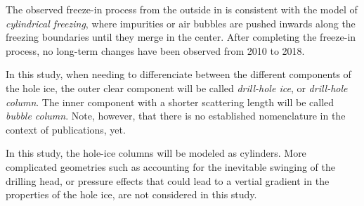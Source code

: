 The observed freeze-in process from the outside in is consistent with the model of \textit{cylindrical freezing}, where impurities or air bubbles are pushed inwards along the freezing boundaries until they merge in the center. \cite{rongenswedishcamera} After completing the freeze-in process, no long-term changes have been observed from 2010 to 2018. \cite{instrumentation, camera2010, camera2018}

In this study, when needing to differenciate between the different components of the hole ice, the outer clear component will be called \textit{drill-hole ice}, or \textit{drill-hole column}. The inner component with a shorter scattering length will be called \textit{bubble column}. Note, however, that there is no established nomenclature in the context of \icecube publications, yet.

In this study, the hole-ice columns will be modeled as cylinders. More complicated geometries such as accounting for the inevitable swinging of the drilling head, or pressure effects that could lead to a vertial gradient in the properties of the hole ice, are not considered in this study.\followup

